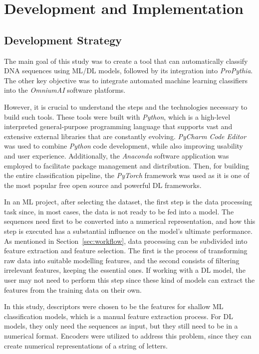 \chapter{Development and Implementation}\label{cha:dev}

\section{Development Strategy}\label{sec:dev_strat}

The main goal of this study was to create a tool that can automatically classify \gls{DNA} sequences using \gls{ML}/\gls{DL} models, followed by its integration into \textit{ProPythia}. The other key objective was to integrate automated machine learning classifiers into the \textit{OmniumAI} software platforms.

However, it is crucial to understand the steps and the technologies necessary to build such tools. These tools were built with \textit{Python}, which is a high-level interpreted general-purpose programming language that supports vast and extensive external libraries that are constantly evolving. \textit{PyCharm Code Editor} was used to combine \textit{Python} code development, while also improving usability and user experience. Additionally, the \textit{Anaconda} software application was employed to facilitate package management and distribution. Then, for building the entire classification pipeline, the \textit{PyTorch} framework was used as it is one of the most popular free open source and powerful \gls{DL} frameworks.

In an \gls{ML} project, after selecting the dataset, the first step is the data processing task since, in most cases, the data is not ready to be fed into a model. The sequences need first to be converted into a numerical representation, and how this step is executed has a substantial influence on the model's ultimate performance. 
As mentioned in Section~\ref{sec:workflow}, data processing can be subdivided into feature extraction and feature selection. The first is the process of transforming raw data into suitable modelling features, and the second consists of filtering irrelevant features, keeping the essential ones. If working with a \gls{DL} model, the user may not need to perform this step since these kind of models can extract the features from the training data on their own.

In this study, descriptors were chosen to be the features for shallow \gls{ML} classification models, which is a manual feature extraction process. For \gls{DL} models, they only need the sequences as input, but they still need to be in a numerical format. Encoders were utilized to address this problem, since they can create numerical representations of a string of letters.






